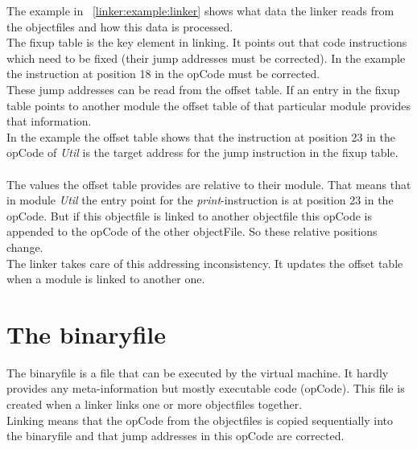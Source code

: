The example in ~\ref{linker:example:linker} shows what data the linker reads from the
objectfiles and how this data is processed. \\
The fixup table is the key element in linking. It points out that code
instructions which need to be fixed (their jump addresses must be corrected).
In the example the instruction at position 18 in the opCode must be corrected. \\
These jump addresses can be read from the offset table. If an entry in the fixup
table points to another module the offset table of that particular module
provides that information.  \\
In the example the offset table shows that the instruction at position 23 in the
opCode of \emph{Util} is the target address for the jump instruction in the
fixup table. \\
\\
The values the offset table provides are relative to their module. That means
that in module \emph{Util} the entry point for the \emph{print}-instruction is
at position 23 in the opCode. But if this objectfile is linked to another
objectfile this opCode is appended to the opCode of the other objectFile. So
these relative positions change. \\
The linker takes care of this addressing inconsistency. It updates the offset
table when a module is linked to another one. 


\section{The binaryfile}
The binaryfile is a file that can be executed by the virtual machine. It hardly
provides any meta-information but mostly executable code (opCode). This file is
created when a linker links one or more objectfiles together. \\
Linking means that the opCode from the objectfiles is copied sequentially into the
binaryfile and that jump addresses in this opCode are corrected. 

